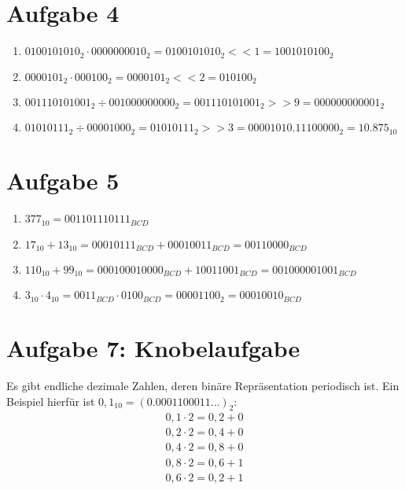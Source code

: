 \documentclass[a4paper]{article}
\begin{document}
\section*{Aufgabe 4}
\begin{enumerate}[label=\alph*)]
    \item $0100101010_2 \cdot 0000000010_2 = 0100101010_2 << 1 = 1001010100_2$
    \item $0000101_2 \cdot 000100_2 = 0000101_2 << 2 = 010100_2$
    \item $001110101001_2 \div 001000000000_2 = 001110101001_2 >> 9 =000000000001_2 $
    \item $01010111_2 \div 00001000_2 = 01010111_2 >> 3 = 00001010.11100000_2 = 10.875_{10}$
\end{enumerate}

\section*{Aufgabe 5}
\begin{enumerate}[label=\alph*)]
    \item $377_{10} = 001101110111_{BCD}$
    \item $17_{10} + 13_{10} = 00010111_{BCD} + 00010011_{BCD} = 00110000_{BCD}$
    \item $110_{10} + 99_{10} = 000100010000_{BCD} + 10011001_{BCD} = 001000001001_{BCD}$
    \item $3_{10} \cdot 4_{10} = 0011_{BCD} \cdot 0100_{BCD} = 00001100_2 = 00010010_{BCD}$
\end{enumerate}

\section*{Aufgabe 7: Knobelaufgabe}
Es gibt endliche dezimale Zahlen, deren binäre Repräsentation periodisch ist. Ein Beispiel hierfür ist $0,1_{10} = (0.0001100011...)_2:$
\begin{align*}
	0,1 \cdot 2 = 0,2 + 0 \\
	0,2 \cdot 2 = 0,4 + 0 \\
	0,4 \cdot 2 = 0,8 + 0 \\
	0,8 \cdot 2 = 0,6 + 1 \\
	0,6 \cdot 2 = 0,2 + 1
\end{align*}
\end{document}
